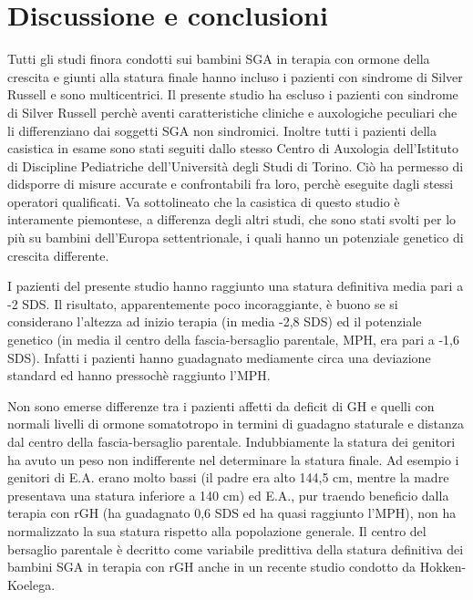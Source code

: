 \chapter{Discussione e conclusioni}


Tutti gli studi finora condotti sui bambini SGA in terapia con ormone della crescita e giunti alla statura finale hanno incluso i pazienti con sindrome di Silver Russell e sono multicentrici. Il presente studio ha escluso i pazienti con sindrome di Silver Russell perchè aventi caratteristiche cliniche e auxologiche peculiari che li differenziano dai soggetti SGA non sindromici. Inoltre tutti i pazienti della casistica in esame sono stati seguiti dallo stesso Centro di Auxologia dell'Istituto di Discipline Pediatriche dell'Università degli Studi di Torino. Ciò ha permesso di didsporre di misure accurate e confrontabili fra loro, perchè eseguite dagli stessi operatori qualificati. Va sottolineato che la casistica di questo studio è interamente piemontese, a differenza degli altri studi, che sono stati svolti per lo più su bambini dell'Europa settentrionale, i quali hanno un potenziale genetico di crescita differente.

I pazienti del presente studio hanno raggiunto una statura definitiva media pari a -2 SDS. Il risultato, apparentemente poco incoraggiante, è buono se si considerano l'altezza ad inizio terapia (in media -2,8 SDS) ed il potenziale genetico (in media il centro della fascia-bersaglio parentale, MPH, era pari a -1,6 SDS). Infatti i pazienti hanno guadagnato mediamente circa una deviazione standard ed hanno pressochè raggiunto l'MPH. 

Non sono emerse differenze tra i pazienti affetti da deficit di GH e quelli con normali livelli di ormone somatotropo in termini di guadagno staturale e distanza dal centro della fascia-bersaglio parentale. Indubbiamente la statura dei genitori ha avuto un peso non indifferente nel determinare la statura finale. Ad esempio i genitori di E.A. erano molto bassi (il padre era alto 144,5 cm, mentre la madre presentava una statura inferiore a 140 cm) ed E.A., pur traendo beneficio dalla terapia con rGH (ha guadagnato 0,6 SDS ed ha quasi raggiunto l'MPH), non ha normalizzato la sua statura rispetto alla popolazione generale.
Il centro del bersaglio parentale è decritto come variabile predittiva della statura definitiva dei bambini SGA in terapia con rGH anche in un recente studio condotto da Hokken-Koelega\cite{de2008prediction}.

